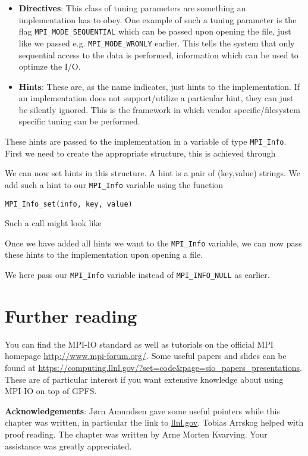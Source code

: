 \begin{itemize}
\item \textbf{Directives}: This class of tuning parameters are something an
  implementation has to obey. One example of such a tuning parameter is the flag
  \texttt{MPI\_MODE\_SEQUENTIAL} which can be passed upon opening the file, just
  like we passed e.g. \texttt{MPI\_MODE\_WRONLY} earlier. This tells the system
  that only sequential access to the data is performed, information which can be
  used to optimze the I/O.
\item \textbf{Hints}: These are, as the name indicates, just hints to the
  implementation. If an implementation does not support/utilize a particular
  hint, they can just be silently ignored. This is the framework in which vendor
  specific/filesystem specific tuning can be performed.
\end{itemize}

These hints are passed to the implementation in a variable of type
\texttt{MPI\_Info}. First we need to create the appropriate structure, this is
achieved through

We can now set hints in this structure. A hint is a pair of (key,value) strings.
We add such a hint to our \texttt{MPI\_Info} variable using the function
\begin{lstlisting}[style=c]
  MPI_Info_set(info, key, value)
\end{lstlisting}
Such a call might look like


Once we have added all hints we want to the \texttt{MPI\_Info} variable, we can
now pass these hints to the implementation upon opening a file.

We here pass our \texttt{MPI\_Info} variable instead of \texttt{MPI\_INFO\_NULL}
as earlier.

\section{Further reading}
You can find the MPI-IO standard as well as tutorials on the official
MPI homepage \url{http://www.mpi-forum.org/}. Some useful papers and slides
can be found at
\url{https://computing.llnl.gov/?set=code\&page=sio\_papers\_presentations}.
These are of particular interest if you want extensive knowledge about using
MPI-IO on top of GPFS.

\textbf{Acknowledgements}: J{\o}rn Amundsen gave some useful pointers while this
chapter was written, in particular the link to \url{llnl.gov}. Tobias Arrskog
helped with proof reading. The chapter was written by Arne Morten Kvarving. Your
assistance was greatly appreciated.

